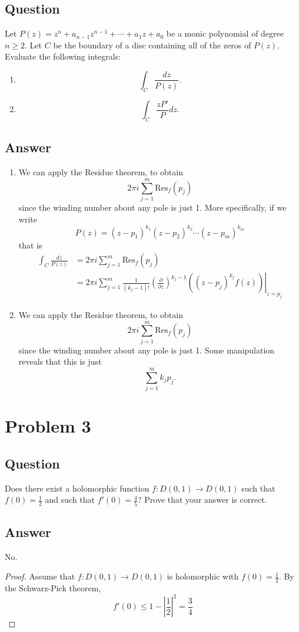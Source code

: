 \documentclass[11pt]{article}
\begin{document}
\subsection{Question}
Let $P(z) = z^n + a_{n-1} z^{n-1} + \cdots + a_1 z+ a_0$ be a monic polynomial of degree $n \geq 2$. Let $C$ be the boundary of a disc containing all of the zeros of $P(z)$. Evaluate the following integrals:
\begin{enumerate}
\item \[\int_C \frac{dz}{P(z)} . \]
\item \[ \int_C \frac{z P'}{P} dz .\]
\end{enumerate}
\subsection{Answer}
\begin{enumerate}
\item We can apply the Residue theorem, to obtain
\[2 \pi i \sum_{j=1}^m  \mbox{Res}_f(p_j)\]
since the winding number about any pole is just 1. More specifically, if we write
\[P(z) = (z - p_1) ^{k_1} (z - p_2)^{k_2} \cdots (z-p_m)^{k_m}\]
that is
\begin{align*}
\int_C \frac{dz}{P(z)}  &= 2 \pi i \sum_{j=1}^m  \mbox{Res}_f(p_j)\\
&= 2 \pi i \sum_{j=1}^ m\frac{1}{(k_j-1)!} \left. \left( \frac{\partial}{\partial z}\right) ^{k_j-1} \left( ( z-p_j)^{k_j} f(z)\right) \right|_{z=p_j}
\end{align*}
\item
We can apply the Residue theorem, to obtain
\[2 \pi i \sum_{j=1}^m  \mbox{Res}_f(p_j)\]
since the winding number about any pole is just 1.
Some manipulation reveals that this is just
\[ \sum_{j=1}^m k_j p_j.\]
\end{enumerate}


\section{Problem 3}
\subsection{Question}
Does there exist a holomorphic function $f: D(0,1) \to D(0,1)$ such that $f(0) = \frac{1}{2}$ and such that $f'(0) = \frac{4}{5}$? Prove that your answer is correct.
\subsection{Answer}
No.
\begin{proof}
Assume that $f: D(0,1) \to D(0,1)$ is holomorphic with $f(0) = \frac{1}{2}$.  By the  Schwarz-Pick theorem, 
\[f'(0) \leq 1 - \left|\frac{1}{2}\right|^2 = \frac{3}{4}\]
\end{proof}
\end{document}

